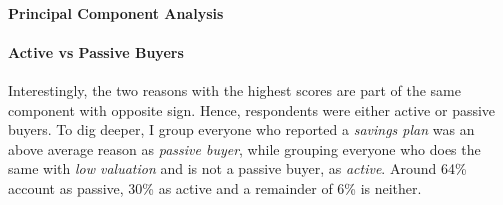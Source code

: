 \documentclass[ProjectABM]{subfiles}
\begin{document}


\paragraph{Principal Component Analysis}




\paragraph{Active vs Passive Buyers}
Interestingly, the two reasons with the highest scores are part of the same component with opposite sign. Hence, respondents were either active or passive buyers. To dig deeper, I group everyone who reported a \textit{savings plan} was an above average reason as \textit{passive buyer}, while grouping everyone who does the same with \textit{low valuation} and is not a passive buyer, as \textit{active}. Around 64\% account as passive, 30\% as active and a remainder of 6\% is neither.
\end{document}
